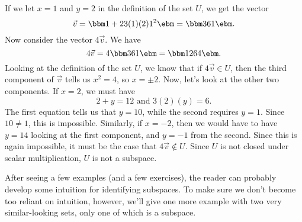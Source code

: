{\begin{enumerate}

If we let $x=1$ and $y=2$ in the definition of the set $U$, we get the vector
\[
\vec v = \bbm 1+2\\3(1)(2)\\1^2\ebm = \bbm 3\\6\\1\ebm.
\]
Now consider the vector $4\vec v$. We have
\[
4\vec v = 4\bbm 3\\6\\1\ebm = \bbm 12\\6\\4\ebm.
\]
Looking at the definition of the set $U$, we know that if $4\vec v\in U$, then the third component of $\vec v$ tells us $x^2=4$, so $x=\pm 2$. Now, let's look at the other two components. If $x=2$, we must have
\[
2+y = 12 \text{ and } 3(2)(y) = 6.
\]
The first equation tells us that $y=10$, while the second requires $y=1$. Since $10\neq 1$, this is impossible. Similarly, if $x=-2$, then we would have to have $y=14$ looking at the first component, and $y=-1$ from the second. Since this is again impossible, it must be the case that $4\vec v\notin U$. Since $U$ is not closed under scalar multiplication, $U$ is not a subspace.
\end{enumerate}

\baselineskip}

\medskip

After seeing a few examples (and a few exercises), the reader can probably develop some intuition for identifying subspaces. To make sure we don't become too reliant on intuition, however, we'll give one more example with two very similar-looking sets, only one of which is a subspace.

\medskip

